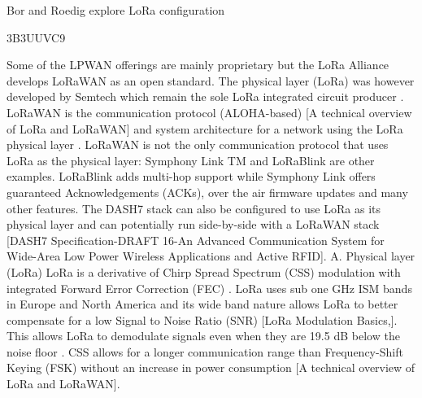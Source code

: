 Bor and Roedig \cite{bor_lora_2017} explore LoRa configuration

\cite{marais_lora_2017} 3B3UUVC9

Some of the LPWAN offerings are mainly proprietary but the LoRa Alliance develops LoRaWAN as an open standard.
The physical layer (LoRa) was however developed by Semtech which remain the sole LoRa integrated circuit producer \cite{bankov_limits_2016}.
LoRaWAN is the communication protocol (ALOHA-based) [A technical overview of LoRa and LoRaWAN] and system architecture for a network using the LoRa physical layer \cite{wixted_evaluation_2016}.
LoRaWAN is not the only communication protocol that uses LoRa as the physical layer:
	Symphony Link TM and LoRaBlink are other examples.
LoRaBlink \cite{bor_lora_nodate} adds multi-hop support while Symphony Link offers guaranteed Acknowledgements (ACKs),
	over the air firmware updates and many other features.
The DASH7 stack can also be configured to use LoRa as its physical layer and can potentially run side-by-side with a LoRaWAN stack [DASH7 Speciﬁcation-DRAFT 16-An Advanced Communication System for Wide-Area Low Power Wireless Applications and Active RFID].
A.
Physical layer (LoRa) LoRa is a derivative of Chirp Spread Spectrum (CSS) modulation with integrated Forward Error Correction (FEC) \cite{reynders_chirp_2016}.
LoRa uses sub one GHz ISM bands in Europe and North America and its wide band nature allows LoRa to better compensate for a low Signal to Noise Ratio (SNR) [LoRa Modulation Basics,].
This allows LoRa to demodulate signals even when they are 19.5 dB below the noise floor \cite{bor_lora_2016}.
CSS allows for a longer communication range than Frequency-Shift Keying (FSK) without an increase in power consumption [A technical overview of LoRa and LoRaWAN].

